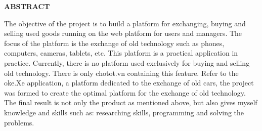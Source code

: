 \documentclass[../DoAn.tex]{subfiles}
\begin{document}
\begin{center}
    \Large{\textbf{ABSTRACT}}\\
\end{center}
\vspace{1cm}

The objective of the project is to build a platform for exchanging, buying and selling used goods running on the web platform for users and managers. The focus of the platform is the exchange of old technology such as phones, computers, cameras, tablets, etc. This platform is a practical application in practice. Currently, there is no platform used exclusively for buying and selling old technology. There is only chotot.vn containing this feature. Refer to the oke.Xe application, a platform dedicated to the exchange of old cars, the project was formed to create the optimal platform for the exchange of old technology. The final result is not only the product as mentioned above, but also gives myself knowledge and skills such as: researching skills, programming and solving the problems.
\end{document}

